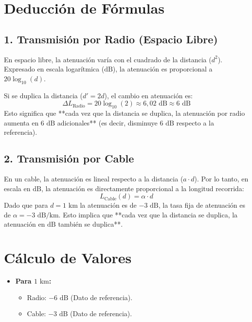\documentclass[11pt,a4paper]{article}
\begin{document}
\begin{enumerate}[label=4.\arabic*), itemsep=0.3cm]
        \section*{Deducción de Fórmulas}

        \subsection*{1. Transmisión por Radio (Espacio Libre)}
        En espacio libre, la atenuación varía con el cuadrado de la distancia ($d^2$). Expresado en escala logarítmica ($\text{dB}$), la atenuación es proporcional a $20 \log_{10}(d)$.

        Si se duplica la distancia ($d' = 2d$), el cambio en atenuación es:
        \[
          \Delta L_{\text{Radio}} = 20 \log_{10}(2) \approx 6,02 \text{ dB} \approx 6 \text{ dB}
        \]
        Esto significa que **cada vez que la distancia se duplica, la atenuación por radio aumenta en $6 \text{ dB}$ adicionales** (es decir, disminuye $6 \text{ dB}$ respecto a la referencia).

        \subsection*{2. Transmisión por Cable}
        En un cable, la atenuación es lineal respecto a la distancia ($a \cdot d$). Por lo tanto, en escala en $\text{dB}$, la atenuación es directamente proporcional a la longitud recorrida:
        \[
          L_{\text{Cable}}(d) = \alpha \cdot d
        \]
        Dado que para $d = 1\text{ km}$ la atenuación es de $-3\text{ dB}$, la tasa fija de atenuación es de $\alpha = -3\text{ dB/km}$.
        Esto implica que **cada vez que la distancia se duplica, la atenuación en $\text{dB}$ también se duplica**.

        \section*{Cálculo de Valores}

        \begin{itemize}
          \item \textbf{Para $1\text{ km}$:}
                \begin{itemize}
                  \item Radio: $-6\text{ dB}$ (Dato de referencia).
                  \item Cable: $-3\text{ dB}$ (Dato de referencia).
                \end{itemize}


\end{itemize}
\end{enumerate}
\end{document}
